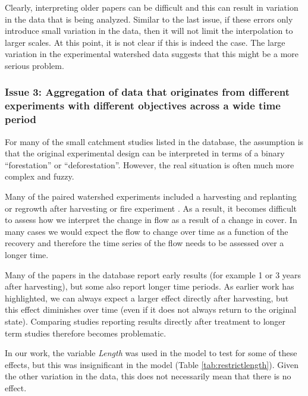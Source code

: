 \documentclass[]{elsarticle} %
\begin{document}
Clearly, interpreting older papers can be difficult and this can result in variation in the data that is being analyzed. Similar to the last issue, if these errors only introduce small variation in the data, then it will not limit the interpolation to larger scales. At this point, it is not clear if this is indeed the case. The large variation in the experimental watershed data suggests that this might be a more serious problem.

\hypertarget{issue-3-aggregation-of-data-that-originates-from-different-experiments-with-different-objectives-across-a-wide-time-period}{%
\subsubsection{Issue 3: Aggregation of data that originates from different experiments with different objectives across a wide time period}\label{issue-3-aggregation-of-data-that-originates-from-different-experiments-with-different-objectives-across-a-wide-time-period}}

For many of the small catchment studies listed in the database, the assumption is that the original experimental design can be interpreted in terms of a binary ``forestation'' or ``deforestation''. However, the real situation is often much more complex and fuzzy.

Many of the paired watershed experiments included a harvesting and replanting or regrowth after harvesting or fire experiment \citep[e.g.][]{cornish1993, cornish2001, webb2013}. As a result, it becomes difficult to assess how we interpret the change in flow as a result of a change in cover. In many cases we would expect the flow to change over time as a function of the recovery \citep{jones2017} and therefore the time series of the flow needs to be assessed over a longer time.

Many of the papers in the database report early results (for example 1 or 3 years after harvesting), but some also report longer time periods. As earlier work \citep{cornish2001, jones2017} has highlighted, we can always expect a larger effect directly after harvesting, but this effect diminishes over time (even if it does not always return to the original state). Comparing studies reporting results directly after treatment to longer term studies therefore becomes problematic.

In our work, the variable \emph{Length} was used in the model to test for some of these effects, but this was insignificant in the model (Table \ref{tab:restrictlength}). Given the other variation in the data, this does not necessarily mean that there is no effect.
\end{document}
